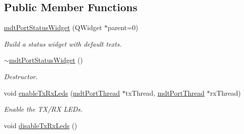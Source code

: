 \subsection*{Public Member Functions}
\begin{DoxyCompactItemize}
\item 
\hypertarget{classmdt_port_status_widget_ac92d61928204f88704de3f597d5754c7}{
\hyperlink{classmdt_port_status_widget_ac92d61928204f88704de3f597d5754c7}{mdtPortStatusWidget} (QWidget $\ast$parent=0)}
\label{classmdt_port_status_widget_ac92d61928204f88704de3f597d5754c7}

\begin{DoxyCompactList}\small\item\em Build a status widget with default texts. \end{DoxyCompactList}\item 
\hypertarget{classmdt_port_status_widget_a239dbbcdc412d2cd332c665a55ecfa9b}{
\hyperlink{classmdt_port_status_widget_a239dbbcdc412d2cd332c665a55ecfa9b}{$\sim$mdtPortStatusWidget} ()}
\label{classmdt_port_status_widget_a239dbbcdc412d2cd332c665a55ecfa9b}

\begin{DoxyCompactList}\small\item\em Destructor. \end{DoxyCompactList}\item 
void \hyperlink{classmdt_port_status_widget_a8e87596be48b5cfda6703c42655b2f25}{enableTxRxLeds} (\hyperlink{classmdt_port_thread}{mdtPortThread} $\ast$txThread, \hyperlink{classmdt_port_thread}{mdtPortThread} $\ast$rxThread)
\begin{DoxyCompactList}\small\item\em Enable the TX/RX LEDs. \end{DoxyCompactList}\item 
\hypertarget{classmdt_port_status_widget_af57ccc9a560d8ae1a49bc57a774a7db7}{
void \hyperlink{classmdt_port_status_widget_af57ccc9a560d8ae1a49bc57a774a7db7}{disableTxRxLeds} ()}
\label{classmdt_port_status_widget_af57ccc9a560d8ae1a49bc57a774a7db7}


\end{DoxyCompactItemize}
